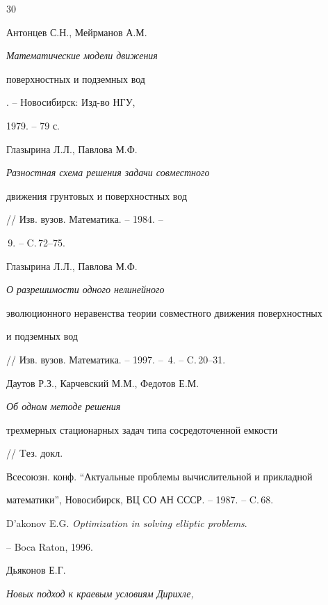 \begin{thebibliography}{30}







Антонцев С.Н., Мейрманов А.М. {\em Математические модели движения


поверхностных и подземных вод}. -- Новосибирск: Изд-во НГУ,


1979. -- 79 с.







Глазырина Л.Л., Павлова М.Ф. {\em Разностная схема решения задачи совместного


движения грунтовых и поверхностных вод}


// Изв. вузов. Математика. -- 1984. --


\No\,9. -- C.\,72--75.







Глазырина Л.Л., Павлова М.Ф. {\em О разрешимости одного нелинейного


эволюционного неравенства теории совместного движения поверхностных


и подземных вод} // Изв. вузов. Математика. -- 1997. -- \No\,4. -- C.\,20--31.







Даутов Р.З., Карчевский М.М., Федотов Е.М. {\em Об одном методе решения


трехмерных стационарных задач типа сосредоточенной емкости} // Tез. докл.


Всесоюзн. конф. ``Актуальные проблемы вычислительной и прикладной 


математики'', Новосибирск, ВЦ СО АН СССР. -- 1987. -- C.\,68.







D'akonov E.G. {\em Optimization in solving elliptic problems}.


-- Boca Raton, 1996. 







Дьяконов Е.Г. {\em Новых подход к краевым условиям Дирихле,


}
\end{thebibliography}
